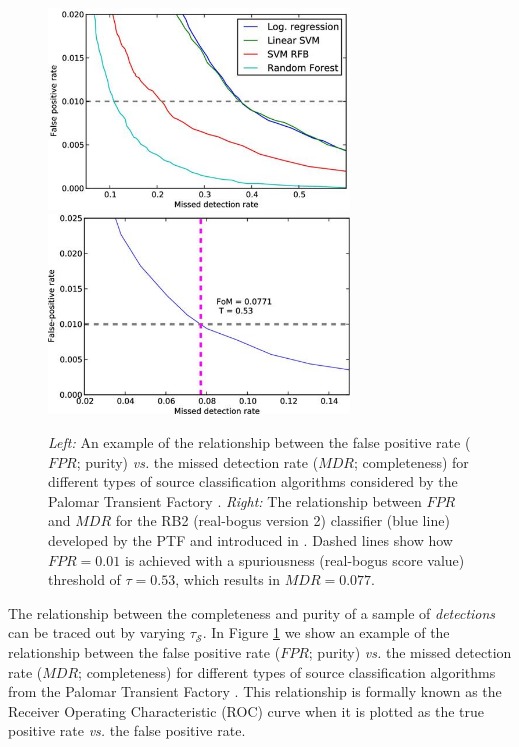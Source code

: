 \documentclass[DM,lsstdraft,toc]{lsstdoc}
\begin{document}
\begin{figure}
\begin{center}
\includegraphics[width=8cm,trim={0cm 0cm 0cm 0cm}, clip]{figures/Brink_etal_2013_Fig3.jpg}
\includegraphics[width=8cm,trim={0cm 0cm 0cm 0cm}, clip]{figures/Brink_etal_2013_Fig7.jpg}
\caption{{\it Left:} An example of the relationship between the false positive rate ($\mathit{FPR}$; purity) {\it vs.} the missed detection rate ($\mathit{MDR}$; completeness) for different types of source classification algorithms considered by the Palomar Transient Factory \citep{2013MNRAS.435.1047B}. {\it Right:} The relationship between $\mathit{FPR}$ and $\mathit{MDR}$ for the RB2 (real-bogus version 2) classifier (blue line) developed by the PTF and introduced in \cite{2013MNRAS.435.1047B}. Dashed lines show how $\mathit{FPR}=0.01$ is achieved with a spuriousness (real-bogus score value) threshold of $\tau=0.53$, which results in $\mathit{MDR}=0.077$. \label{fig:comp_pure}}
\end{center}
\end{figure}

The relationship between the completeness and purity of a sample of {\it detections} can be traced out by varying $\tau_{\mathcal{S}}$. In Figure \ref{fig:comp_pure} we show an example of the relationship between the false positive rate ($\mathit{FPR}$; purity) {\it vs.} the missed detection rate ($\mathit{MDR}$; completeness) for different types of source classification algorithms from the Palomar Transient Factory \citep[PTF;][]{2013MNRAS.435.1047B}. This relationship is formally known as the Receiver Operating Characteristic (ROC) curve when it is plotted as the true positive rate {\it vs.} the false positive rate. 
\end{document}
